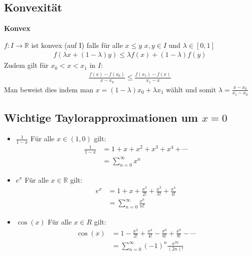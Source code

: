 \documentclass[25pt]{sciposter}
\newcommand{\R}{\mathbb{R}}
\newenvironment{method}[1]{\begin{mdframed}[backgroundcolor=blue!10,innertopmargin=15pt, innerbottommargin=15pt,nobreak=true]
		\textbf{#1 }
	}
	{ 
	\end{mdframed}
}
\begin{document}
\begin{multicols}{3}
		
		
		\subsection*{Konvexität}
		
		\begin{method}{Konvex}
			$f : I \to \R$ ist konvex (auf I) falls für alle $x \leq y$ $x,y \in I$ und $\lambda \in [0,1]$
			\begin{align*}
				f(\lambda x + (1-\lambda)y) \leq \lambda f(x) + (1-\lambda)f(y)
			\end{align*}
			Zudem gilt für $x_0 < x< x_1$ in $I$:
			\begin{align*}
				\frac{f(x) - f(x_0)}{x-x_0} \leq \frac{f(x_1) - f(x)}{x_1 - x}
			\end{align*}
			Man beweist dies indem man $x = (1-\lambda) x_0 + \lambda x_1$ wählt und somit $\lambda = \frac{x-x_0}{x_1 - x_0}$
		\end{method}
		
		
		
		
		\subsection*{Wichtige Taylorapproximationen um $x=0$}
		\begin{itemize}
			\item $\boxed{\frac{1}{1-x}}$ Für alle $x \in (1,0)$ gilt:
			\begin{align*}
				{\frac{1}{1-x}} &= 1 + x + x^2 + x^3 + x^4 + \cdots \\
				&= \sum_{n=0}^{\infty} x^n
			\end{align*}	
			
			\item $\boxed{e^x}$ Für alle $x \in \R$ gilt:
			\begin{align*}
				e^x &= 1 + x + \frac{x^2}{2!} + \frac{x^3}{3!} + \frac{x^4}{4!}\\
				&= \sum_{n=0}^{\infty} \frac{x^n}{n!}
			\end{align*}
			
			\item $\boxed{\cos(x)}$ Für alle $x\in R$ gilt:
			\begin{align*}
				\cos(x) &= 1 - \frac{x^2}{2!} + \frac{x^4}{4!} - \frac{x^6}{6!} + \frac{x^8}{8!} - \cdots  \\
				&= \sum_{n=0}^{\infty} (-1)^n \frac{x^{2n}}{(2n)!}
			\end{align*}
			

\end{itemize}
\end{multicols}
\end{document}
